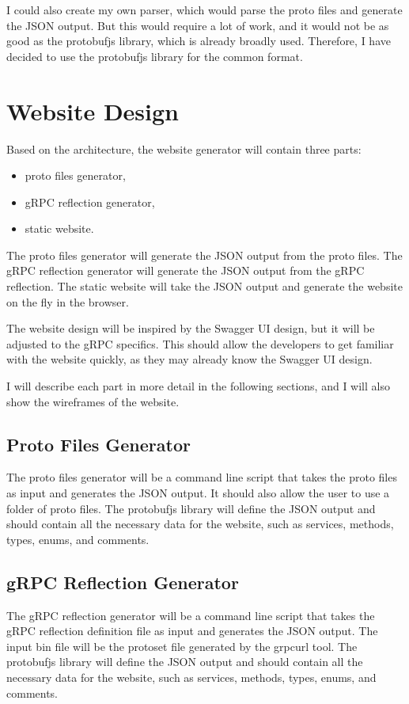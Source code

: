 I could also create my own parser, which would parse the proto files and generate the JSON output.
But this would require a lot of work, and it would not be as good as the protobufjs library, which is already broadly used.
Therefore, I have decided to use the protobufjs library for the common format.


\section{Website Design}
Based on the architecture, the website generator will contain three parts:
\begin{itemize}
    \item proto files generator,
    \item gRPC reflection generator,
    \item static website.
\end{itemize}

The proto files generator will generate the JSON output from the proto files.
The gRPC reflection generator will generate the JSON output from the gRPC reflection.
The static website will take the JSON output and generate the website on the fly in the browser.

The website design will be inspired by the Swagger UI design, but it will be adjusted to the gRPC specifics.
This should allow the developers to get familiar with the website quickly, as they may already know the Swagger UI design.

I will describe each part in more detail in the following sections, and I will also show the wireframes of the website.

\subsection{Proto Files Generator}
The proto files generator will be a command line script that takes the proto files as input and generates the JSON output.
It should also allow the user to use a folder of proto files.
The protobufjs library will define the JSON output and should contain all the necessary data for the website, such as services, methods, types, enums, and comments.

\subsection{gRPC Reflection Generator}
The gRPC reflection generator will be a command line script that takes the gRPC reflection definition file as input and generates the JSON output.
The input bin file will be the protoset file generated by the grpcurl tool.
The protobufjs library will define the JSON output and should contain all the necessary data for the website, such as services, methods, types, enums, and comments.

